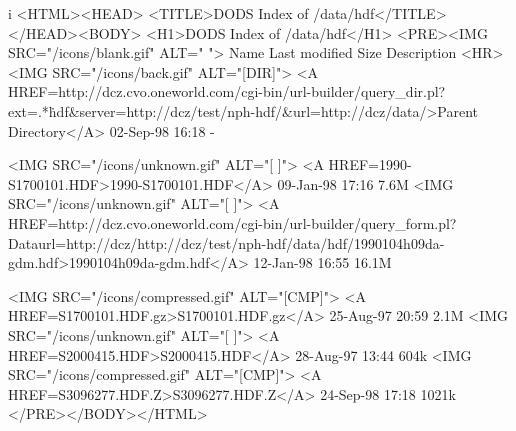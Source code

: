 

\begin{vcode}{i}
<HTML><HEAD>
<TITLE>DODS Index of /data/hdf</TITLE>
</HEAD><BODY>
<H1>DODS Index of /data/hdf</H1>
<PRE><IMG SRC="/icons/blank.gif" ALT="     "> Name                   Last modified     Size  Description
<HR>
<IMG SRC="/icons/back.gif" ALT="[DIR]"> <A HREF=http://dcz.cvo.oneworld.com/cgi-bin/url-builder/query_dir.pl?
ext=.*\.hdf&server=http://dcz/test/nph-hdf/&url=http://dcz/data/>Parent Directory</A>       02-Sep-98 16:18      -  

<IMG SRC="/icons/unknown.gif" ALT="[   ]"> <A HREF=1990-S1700101.HDF>1990-S1700101.HDF</A>      09-Jan-98 17:16   7.6M  
<IMG SRC="/icons/unknown.gif" ALT="[   ]"> <A HREF=http://dcz.cvo.oneworld.com/cgi-bin/url-builder/query_form.pl?
Dataurl=http://dcz/http://dcz/test/nph-hdf/data/hdf/1990104h09da-gdm.hdf>1990104h09da-gdm.hdf</A>   12-Jan-98 16:55  16.1M

<IMG SRC="/icons/compressed.gif" ALT="[CMP]"> <A HREF=S1700101.HDF.gz>S1700101.HDF.gz</A>        25-Aug-97 20:59   2.1M  
<IMG SRC="/icons/unknown.gif" ALT="[   ]"> <A HREF=S2000415.HDF>S2000415.HDF</A>           28-Aug-97 13:44   604k  
<IMG SRC="/icons/compressed.gif" ALT="[CMP]"> <A HREF=S3096277.HDF.Z>S3096277.HDF.Z</A>         24-Sep-98 17:18  1021k  
</PRE></BODY></HTML>
\end{vcode}
